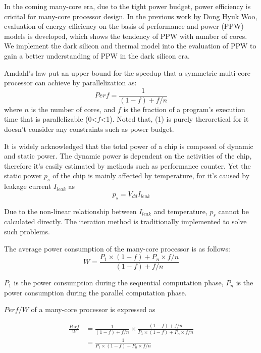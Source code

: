 In the coming many-core era, due to the tight power budget, power efficiency is cricital for
many-core processor design. In the previous work by Dong Hyuk Woo, evaluation of energy
efficiency on the basis of performance and power (PPW) models is developed, which shows the
tendency of PPW with number of cores. We implement the dark silicon and thermal model into the
evaluation of PPW to gain a better understanding of PPW in the dark silicon era.

Amdahl's law put an upper bound for the speedup that a symmetric multi-core processor can achieve by parallelization as:
\begin{equation}\label{speedup}
Perf = \frac{1} {(1-f)+f/n}
\end{equation}
where  $n$ is the number of cores, and $f$ is the fraction of a program's execution time that is parallelizable (0<$f$<1). Noted that, (1) is purely theroretical for it doesn't consider any constraints such as power budget.



It is widely acknowledged that the total power of a chip is composed of dynamic and 
static power. The dynamic power is dependent on the activities of the chip, therefore it's 
easily estimated by methods such as performance counter.
Yet the static power $p_{s}$ of the chip is mainly affected by temperature, for it's caused by
leakage current $I_{leak}$ as
\begin{equation}\label{ps}
p_{s} = V_{dd}I_{leak}
\end{equation}

Due to the non-linear relationship between $I_{leak}$ and temperature, $p_{s}$ cannot be
calculated directly. The iteration method is traditionally implemented to solve such problems.

The average power consumption of the many-core processor is as follows:
\begin{equation}\label{average_power}
W = \frac{P_{1} \times (1-f)+P_{n} \times f/n}{(1-f)+f/n}
\end{equation}

$P_{1}$ is the power consumption during the sequential computation phase, $P_{n}$ is the power 
consumption during the parallel computation phase. 

$Perf/W$ of a many-core processor is expressed as

\begin{equation}\label{ppw}
\begin{split}
\frac{Perf}{W} &= \frac{1}{(1-f)+f/n} \times \frac{(1-f)+f/n}{P_{1} \times (1-f)+P_{n} \times f/n}\\
&= \frac{1}{P_{1} \times (1-f)+P_{n} \times f/n}
\end{split}
\end{equation}


